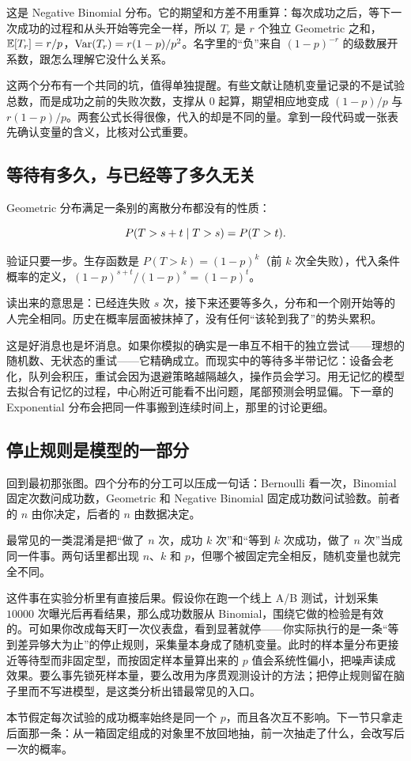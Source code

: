 这是 Negative Binomial 分布。它的期望和方差不用重算：每次成功之后，等下一次成功的过程和从头开始等完全一样，所以 \(T_r\) 是 \(r\) 个独立 Geometric 之和，\(\mathbb{E}[T_r]=r/p\)，\(\operatorname{Var}(T_r)=r(1-p)/p^2\)。名字里的``负''来自 \((1-p)^{-r}\) 的级数展开系数，跟怎么理解它没什么关系。

这两个分布有一个共同的坑，值得单独提醒。有些文献让随机变量记录的不是试验总数，而是成功之前的失败次数，支撑从 \(0\) 起算，期望相应地变成 \((1-p)/p\) 与 \(r(1-p)/p\)。两套公式长得很像，代入的却是不同的量。拿到一段代码或一张表先确认变量的含义，比核对公式重要。

\subsection{等待有多久，与已经等了多久无关}

Geometric 分布满足一条别的离散分布都没有的性质：

\[
P(T>s+t\mid T>s)=P(T>t).
\]

验证只要一步。生存函数是 \(P(T>k)=(1-p)^k\)（前 \(k\) 次全失败），代入条件概率的定义，\((1-p)^{s+t}/(1-p)^s=(1-p)^t\)。

读出来的意思是：已经连失败 \(s\) 次，接下来还要等多久，分布和一个刚开始等的人完全相同。历史在概率层面被抹掉了，没有任何``该轮到我了''的势头累积。

这是好消息也是坏消息。如果你模拟的确实是一串互不相干的独立尝试——理想的随机数、无状态的重试——它精确成立。而现实中的等待多半带记忆：设备会老化，队列会积压，重试会因为退避策略越隔越久，操作员会学习。用无记忆的模型去拟合有记忆的过程，中心附近可能看不出问题，尾部预测会明显偏。下一章的 Exponential 分布会把同一件事搬到连续时间上，那里的讨论更细。

\subsection{停止规则是模型的一部分}

回到最初那张图。四个分布的分工可以压成一句话：Bernoulli 看一次，Binomial 固定次数问成功数，Geometric 和 Negative Binomial 固定成功数问试验数。前者的 \(n\) 由你决定，后者的 \(n\) 由数据决定。

最常见的一类混淆是把``做了 \(n\) 次，成功 \(k\) 次''和``等到 \(k\) 次成功，做了 \(n\) 次''当成同一件事。两句话里都出现 \(n\)、\(k\) 和 \(p\)，但哪个被固定完全相反，随机变量也就完全不同。

这件事在实验分析里有直接后果。假设你在跑一个线上 A/B 测试，计划采集 \(10000\) 次曝光后再看结果，那么成功数服从 Binomial，围绕它做的检验是有效的。可如果你改成每天盯一次仪表盘，看到显著就停——你实际执行的是一条``等到差异够大为止''的停止规则，采集量本身成了随机变量。此时的样本量分布更接近等待型而非固定型，而按固定样本量算出来的 \(p\) 值会系统性偏小，把噪声读成效果。要么事先锁死样本量，要么改用为序贯观测设计的方法；把停止规则留在脑子里而不写进模型，是这类分析出错最常见的入口。

本节假定每次试验的成功概率始终是同一个 \(p\)，而且各次互不影响。下一节只拿走后面那一条：从一箱固定组成的对象里不放回地抽，前一次抽走了什么，会改写后一次的概率。
